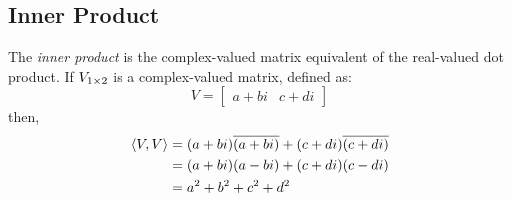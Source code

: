 \subsection{Inner Product}\label{subsec:Inner_Product}
\begin{definition}\label{def:Inner_Product}
  The \emph{inner product} is the complex-valued matrix equivalent of the real-valued dot product.
  If $V_{1 \times 2}$ is a complex-valued matrix, defined as:
  \begin{equation*}
    V =
    \begin{bmatrix}
      a + bi & c + di
    \end{bmatrix}
  \end{equation*}
  then,
  \begin{equation}\label{eq:Inner_Product}
    \begin{aligned}
      \left\langle V, V \right\rangle &= (a+bi) \overline{(a+bi)} + (c+di) \overline{(c+di)} \\
      &= (a+bi) (a-bi) + (c+di) (c-di) \\
      &= a^{2} + b^{2} + c^{2} + d^{2}
    \end{aligned}
  \end{equation}

\end{definition}

